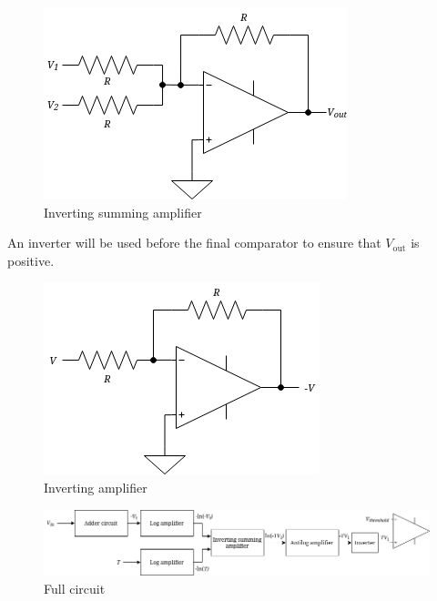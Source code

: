 \documentclass[a4paper, 12pt, oneside]{book}
\begin{document}
\begin{figure}[H]
  \centering
  \includegraphics[scale=0.5]{summing.png}
  \caption{Inverting summing amplifier}
\end{figure}

An inverter will be used before the final comparator to ensure that $V_{\text{out}}$ is positive.

\begin{figure}[H]
  \centering
  \includegraphics[scale=0.5]{inverter.png}
  \caption{Inverting amplifier}
\end{figure}

\begin{figure}[H]
  \centering
  \includegraphics[scale=0.5]{full_circuit.png}
  \caption{Full circuit}
\end{figure}


\end{document}
